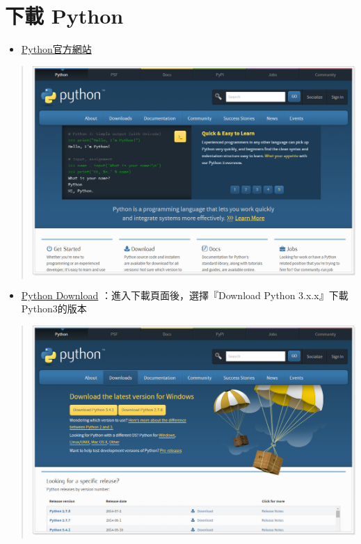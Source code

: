 \documentclass[letterpaper,10pt,english]{sphinxmanual}
\begin{document}
\section{下載 Python}
\label{_doc/sphinx-doc-win/index:python}\begin{itemize}
\item {} 
\href{https://www.python.org/}{Python官方網站}

\end{itemize}
\begin{quote}

\includegraphics{Python-Download-001.png}
\end{quote}
\begin{itemize}
\item {} 
\href{https://www.python.org/downloads/}{Python Download} ：進入下載頁面後，選擇『Download Python 3.x.x』下載Python3的版本

\end{itemize}
\begin{quote}

\includegraphics{Python-Download-002.png}
\end{quote}
\end{document}
